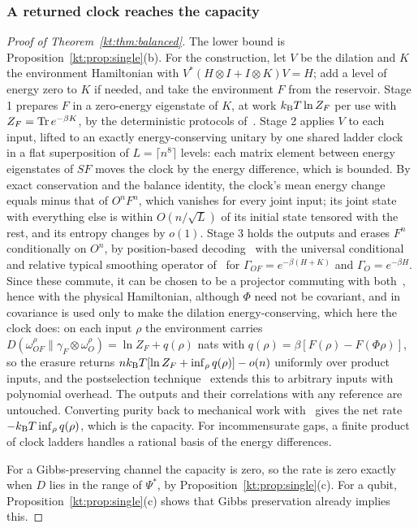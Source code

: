 \subsubsection{A returned clock reaches the capacity}\label{kt:pf:balanced}

\begin{proof}[Proof of Theorem~\ref{kt:thm:balanced}]
The lower bound is Proposition~\ref{kt:prop:single}(b). For the construction, let $V$ be the dilation and $K$ the environment Hamiltonian with $V^*(H\otimes I+I\otimes K)V=H$; add a level of energy zero to $K$ if needed, and take the environment $F$ from the reservoir. Stage 1 prepares $F$ in a zero-energy eigenstate of $K$, at work $k_{\mathrm B} T\ln Z_F$ per use with $Z_F=\operatorname{Tr} e^{-\beta K}$, by the deterministic protocols of~\cite{HorodeckiOppenheim13}. Stage 2 applies $V$ to each input, lifted to an exactly energy-conserving unitary by one shared ladder clock in a flat superposition of $L=\lceil n^8\rceil$ levels: each matrix element between energy eigenstates of $S F$ moves the clock by the energy difference, which is bounded. By exact conservation and the balance identity, the clock's mean energy change equals minus that of $O^nF^n$, which vanishes for every joint input; its joint state with everything else is within $O(n/\sqrt L)$ of its initial state tensored with the rest, and its entropy changes by $o(1)$. Stage 3 holds the outputs and erases $F^n$ conditionally on $O^n$, by position-based decoding~\cite[Prop.~7.1]{FBB21} with the universal conditional and relative typical smoothing operator of~\cite[Prop.~6.1]{FBB21} for $\Gamma_{OF}=e^{-\beta(H+K)}$ and $\Gamma_O=e^{-\beta H}$. Since these commute, it can be chosen to be a projector commuting with both~\cite[Prop.~6.1]{FBB21}, hence with the physical Hamiltonian, although $\Phi$ need not be covariant, and in~\cite[Thm.~7.1]{FBB21} covariance is used only to make the dilation energy-conserving, which here the clock does: on each input $\rho$ the environment carries $D(\omega^\rho_{OF}\|\gamma_F\otimes\omega^\rho_O)=\ln Z_F+q(\rho)$ nats with $q(\rho)=\beta[F(\rho)-F(\Phi\rho)]$, so the erasure returns $nk_{\mathrm B} T[\ln Z_F+\inf_\rho q(\rho)]-o(n)$ uniformly over product inputs, and the postselection technique~\cite{ChristandlKonigRenner09} extends this to arbitrary inputs with polynomial overhead. The outputs and their correlations with any reference are untouched. Converting purity back to mechanical work with~\cite{HorodeckiOppenheim13} gives the net rate $-k_{\mathrm B} T\inf_\rho q(\rho)$, which is the capacity. For incommensurate gaps, a finite product of clock ladders handles a rational basis of the energy differences.

For a Gibbs-preserving channel the capacity is zero, so the rate is zero exactly when $D$ lies in the range of $\Psi^*$, by Proposition~\ref{kt:prop:single}(c). For a qubit, Proposition~\ref{kt:prop:single}(c) shows that Gibbs preservation already implies this.
\end{proof}

